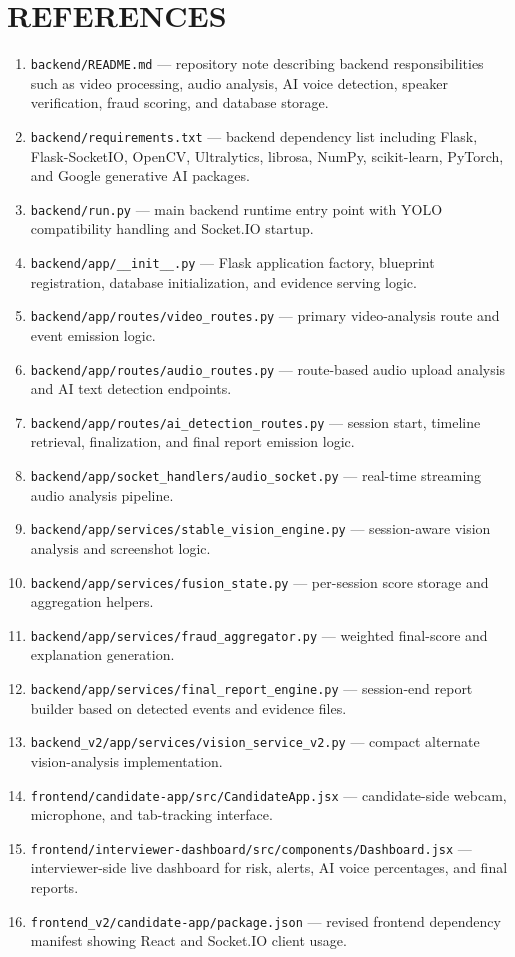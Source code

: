 \documentclass[12pt,a4paper]{extreport}
\newcommand{\frontchapter}[1]{
  \phantomsection
  \chapter*{#1}
  \addcontentsline{toc}{chapter}{#1}
}
\begin{document}
\frontchapter{REFERENCES}
\begin{enumerate}[leftmargin=0.4in]
  \item \texttt{backend/README.md} --- repository note describing backend responsibilities such as video processing, audio analysis, AI voice detection, speaker verification, fraud scoring, and database storage.
  \item \texttt{backend/requirements.txt} --- backend dependency list including Flask, Flask-SocketIO, OpenCV, Ultralytics, librosa, NumPy, scikit-learn, PyTorch, and Google generative AI packages.
  \item \texttt{backend/run.py} --- main backend runtime entry point with YOLO compatibility handling and Socket.IO startup.
  \item \texttt{backend/app/\_\_init\_\_.py} --- Flask application factory, blueprint registration, database initialization, and evidence serving logic.
  \item \texttt{backend/app/routes/video\_routes.py} --- primary video-analysis route and event emission logic.
  \item \texttt{backend/app/routes/audio\_routes.py} --- route-based audio upload analysis and AI text detection endpoints.
  \item \texttt{backend/app/routes/ai\_detection\_routes.py} --- session start, timeline retrieval, finalization, and final report emission logic.
  \item \texttt{backend/app/socket\_handlers/audio\_socket.py} --- real-time streaming audio analysis pipeline.
  \item \texttt{backend/app/services/stable\_vision\_engine.py} --- session-aware vision analysis and screenshot logic.
  \item \texttt{backend/app/services/fusion\_state.py} --- per-session score storage and aggregation helpers.
  \item \texttt{backend/app/services/fraud\_aggregator.py} --- weighted final-score and explanation generation.
  \item \texttt{backend/app/services/final\_report\_engine.py} --- session-end report builder based on detected events and evidence files.
  \item \texttt{backend\_v2/app/services/vision\_service\_v2.py} --- compact alternate vision-analysis implementation.
  \item \texttt{frontend/candidate-app/src/CandidateApp.jsx} --- candidate-side webcam, microphone, and tab-tracking interface.
  \item \texttt{frontend/interviewer-dashboard/src/components/Dashboard.jsx} --- interviewer-side live dashboard for risk, alerts, AI voice percentages, and final reports.
  \item \texttt{frontend\_v2/candidate-app/package.json} --- revised frontend dependency manifest showing React and Socket.IO client usage.
\end{enumerate}
\end{document}
